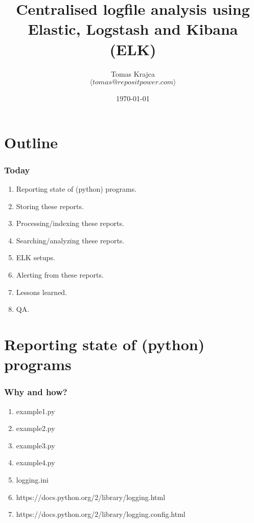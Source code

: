 \documentclass[13pt, ignorenonframetext]{beamer}
\institute[PUG@Canberra]{PUG Meetup   \\
Canberra}
\title[Centralised logfile analysis using ELK]{Centralised logfile analysis using Elastic, Logstash and Kibana (ELK)}
\author[Tomas Krajca]{Tomas Krajca \\{\tiny $\langle tomas@repositpower.com \rangle$}}
\date{\today}
\begin{document}
\begin{frame}[plain]
	\titlepage
\end{frame}


\section{Outline}
\frame
{
  \frametitle{Today}
  \begin{enumerate}
  \item Reporting state of (python) programs.
  \item Storing these reports.
  \item Processing/indexing these reports.
  \item Searching/analyzing these reports.
  \item ELK setups.
  \item Alerting from these reports.
  \item Lessons learned.
  \item QA.
  \end{enumerate}
}

\section{Reporting state of (python) programs}
\begin{frame}
\frametitle{Why and how?}
\begin{enumerate}
\item example1.py
\item example2.py
\item example3.py
\item example4.py
\item logging.ini
\item https://docs.python.org/2/library/logging.html
\item https://docs.python.org/2/library/logging.config.html
\end{enumerate}
\end{frame}
\end{document}
